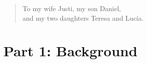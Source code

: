 \documentclass[11pt,fleqn]{book} %
\begin{document}
\newpage\null\thispagestyle{empty}\newpage

\newpage
\thispagestyle{empty}

\begin{quote}
\begin{flushright}
To my wife Justi, my son Daniel, \\
and my two daughters Teresa and Lucía.
\end{flushright}
\end{quote}




\pagestyle{empty} %

\tableofcontents %



\cleardoublepage %

\pagestyle{fancy} %

%
%



%
%



%
%
%
%

\part{\label{part:Background}Part 1: Background}


%
%



%
%



%
%



%
%



%
%
\end{document}
